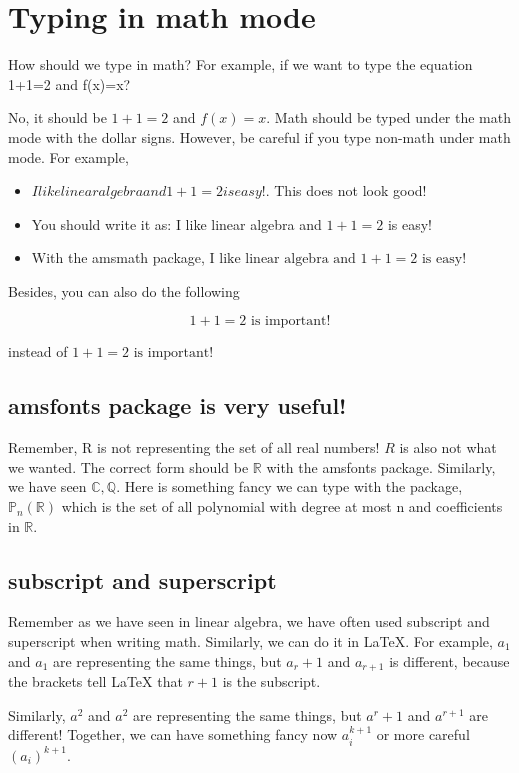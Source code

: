 \documentclass{article}
\begin{document}
\section{Typing in math mode}
How should we type in math? For example, if we want to type the equation 1+1=2 and f(x)=x?

No, it should be $1+1=2$ and $f(x) = x$. Math should be typed under the math mode with the dollar signs. However, be careful if you type non-math under math mode. For example,

\begin{itemize}
    \item $I like linear algebra and 1+1=2 is easy!$. This does not look good!
    \item You should write it as: I like linear algebra and $1+1=2$ is easy! 
    \item With the amsmath package, $\text{I like linear algebra and } 1+1=2 \text{ is easy!}$
\end{itemize}

Besides, you can also do the following

$$
1+1=2 \text{ is important!}
$$

instead of $1+1=2 \text{ is important!}$

\subsection{amsfonts package is very useful!}
Remember, R is not representing the set of all real numbers! $R$ is also not what we wanted. The correct form should be $\mathbb{R}$ with the amsfonts package. Similarly, we have seen $\mathbb{C}, \mathbb{Q}$. Here is something fancy we can type with the package, $\mathbb{P}_n(\mathbb{R})$ which is the set of all polynomial with degree at most n and coefficients in $\mathbb{R}$.

\subsection{subscript and superscript}
Remember as we have seen in linear algebra, we have often used subscript and superscript when writing math. Similarly, we can do it in LaTeX. For example,
$a_1$ and $a_{1}$ are representing the same things, but $a_r+1$ and $a_{r+1}$ is different, because the brackets tell LaTeX that $r+1$ is the subscript.

Similarly, $a^2$ and $a^{2}$ are representing the same things, but $a^r+1$ and $a^{r+1}$ are different! Together, we can have something fancy now $a_{i}^{k+1}$ or more careful $(a_{i})^{k+1}$.
\end{document}
